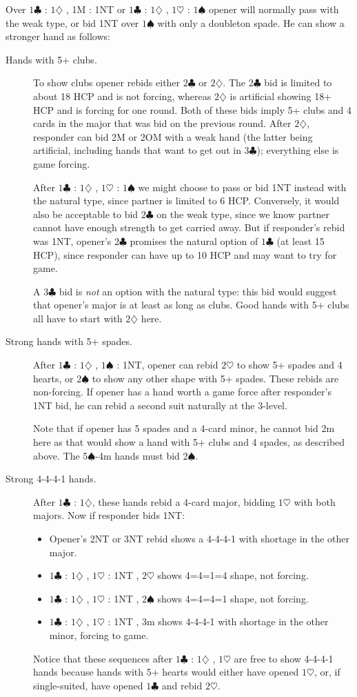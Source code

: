 \documentclass{article}
\newcommand{\sz}{\spadesuit}
\newcommand{\hz}{\heartsuit}
\newcommand{\dz}{\diamondsuit}
\newcommand{\cz}{\clubsuit}
\begin{document}
Over $1\cz$ : $1\dz$ , 1M : 1NT  or $1\cz$ : $1\dz$ , $1\hz$ : $1\sz$ opener will normally pass with the weak type, or bid 1NT over $1\sz$ with only a doubleton spade. He can show a stronger hand as follows:
\begin{description}
\item[Hands with 5+ clubs.] To show clubs opener rebids either $2\cz$ or $2\dz$. The $2\cz$ bid is limited to about 18 HCP and is not forcing, whereas $2\dz$ is artificial showing 18+ HCP and is forcing for one round. Both of these bids imply 5+ clubs and 4 cards in the major that was bid on the previous round. After $2\dz$, responder can bid 2M or 2OM with a weak hand (the latter being artificial, including hands that want to get out in $3\cz$); everything else is game forcing.

After $1\cz$ : $1\dz$ , $1\hz$ : $1\sz$ we might choose to pass or bid 1NT instead with the natural type, since partner is limited to 6 HCP. Conversely, it would also be acceptable to bid $2\cz$ on the weak type, since we know partner cannot have enough strength to get carried away. But if responder's rebid was 1NT, opener's $2\cz$ promises the natural option of $1\cz$ (at least 15 HCP), since responder can have up to 10 HCP and may want to try for game.

A $3\cz$ bid is \emph{not} an option with the natural type: this bid would suggest that opener's major is at least as long as clubs. Good hands with 5+ clubs all have to start with $2\dz$ here.
\item[Strong hands with 5+ spades.] After $1\cz$ : $1\dz$ , $1\sz$ : 1NT, opener can rebid $2\hz$ to show 5+ spades and 4 hearts, or $2\sz$ to show any other shape with 5+ spades. These rebids are non-forcing. If opener has a hand worth a game force after responder's 1NT bid, he can rebid a second suit naturally at the 3-level.

Note that if opener has 5 spades and a 4-card minor, he cannot bid 2m here as that would show a hand with 5+ clubs and 4 spades, as described above. The 5$\sz$-4m hands must bid $2\sz$.
\item[Strong 4-4-4-1 hands.] After $1\cz$ : $1\dz$, these hands rebid a 4-card major, bidding $1\hz$ with both majors. Now if responder bids 1NT:
\begin{itemize}
\item Opener's 2NT or 3NT rebid shows a 4-4-4-1 with shortage in the other major.
\item $1\cz$ : $1\dz$ , $1\hz$ : 1NT , $2\hz$ shows 4=4=1=4 shape, not forcing.
\item $1\cz$ : $1\dz$ , $1\hz$ : 1NT , $2\sz$ shows 4=4=4=1 shape, not forcing.
\item $1\cz$ : $1\dz$ , $1\hz$ : 1NT , 3m shows 4-4-4-1 with shortage in the other minor, forcing to game.
\end{itemize}
Notice that these sequences after $1\cz$ : $1\dz$ , $1\hz$ are free to show 4-4-4-1 hands because hands with 5+ hearts would either have opened $1\hz$, or, if single-suited, have opened $1\cz$ and rebid $2\hz$.


\end{description}
\end{document}
